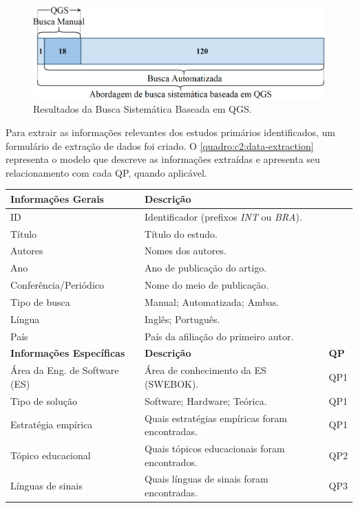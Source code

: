 \begin{figure}[htb]
\centering 
\caption{Resultados da Busca Sistemática Baseada em QGS.}
\label{method:figure:evaluation-refinement}
\includegraphics[width=.9\textwidth]{images/chapter2-sm-qgs-search.png}
\fautor
\end{figure}

Para extrair as informações relevantes dos estudos primários identificados, um formulário de extração de dados foi criado. O \autoref{quadro:c2:data-extraction} representa o modelo que descreve as informações extraídas e apresenta seu relacionamento com cada QP, quando aplicável.


\begin{quadro}[htb]
\centering
\caption{Formulário de Extração de Dados.}
\label{quadro:c2:data-extraction}
\begin{tabular}{l|l|l} \hline
\textbf{Informações Gerais} & \multicolumn{2}{l}{\textbf{Descrição}} \\ \hline
ID & \multicolumn{2}{l}{Identificador (prefixos \textit{INT} ou \textit{BRA}).} \\
Título & \multicolumn{2}{l}{Título do estudo.} \\
Autores & \multicolumn{2}{l}{Nomes dos autores.} \\
Ano & \multicolumn{2}{l}{Ano de publicação do artigo.} \\
Conferência/Periódico & \multicolumn{2}{l}{Nome do meio de publicação.} \\
Tipo de busca & \multicolumn{2}{l}{Manual; Automatizada; Ambas.} \\
Língua & \multicolumn{2}{l}{Inglês; Português.} \\
País & \multicolumn{2}{l}{País da afiliação do primeiro autor.} \\ \hline
\textbf{Informações Específicas} & \textbf{Descrição} & \textbf{QP} \\ \hline
Área da Eng. de Software (ES) & Área de conhecimento da ES (SWEBOK). & QP1 \\
Tipo de solução & Software; Hardware; Teórica. & QP1 \\
Estratégia empírica & Quais estratégias empíricas foram encontradas. & QP1 \\
Tópico educacional & Quais tópicos educacionais foram encontrados. & QP2 \\
Línguas de sinais & Quais línguas de sinais foram encontradas. & QP3 \\ \hline
\end{tabular}
\end{quadro}


